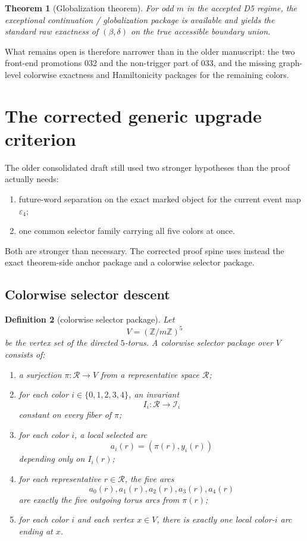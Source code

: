 \documentclass[11pt]{article}
\newtheorem{theorem}{Theorem}[section]
\newtheorem{definition}[theorem]{Definition}
\newcommand{\Z}{\mathbb Z}
\newcommand{\Rm}{\mathcal R}
\newcommand{\I}{\mathcal I}
\newcommand{\eps}{\varepsilon}
\begin{document}
\begin{theorem}[Globalization theorem]
For odd $m$ in the accepted D5 regime, the exceptional continuation /
globalization package is available and yields the standard raw exactness of
$(\beta,\delta)$ on the true accessible boundary union.
\end{theorem}

What remains open is therefore narrower than in the older manuscript: the two
front-end promotions \textup{032} and the non-trigger part of \textup{033},
and the missing graph-level colorwise exactness and Hamiltonicity packages for
the remaining colors.

\section{The corrected generic upgrade criterion}

The older consolidated draft still used two stronger hypotheses than the proof
actually needs:
\begin{enumerate}[label=\textup{(\roman*)},leftmargin=2.5em]
\item future-word separation on the exact marked object for the current event
      map $\eps_4$;
\item one common selector family carrying all five colors at once.
\end{enumerate}
Both are stronger than necessary. The corrected proof spine uses instead the
exact theorem-side anchor package and a colorwise selector package.

\subsection{Colorwise selector descent}

\begin{definition}[colorwise selector package]
Let
\[
V=(\Z/m\Z)^5
\]
be the vertex set of the directed $5$-torus.
A \emph{colorwise selector package} over $V$ consists of:
\begin{enumerate}[label=\textup{(C\arabic*)},leftmargin=2.9em]
\item a surjection $\pi:\Rm\to V$ from a representative space $\Rm$;
\item for each color $i\in\{0,1,2,3,4\}$, an invariant
      \[
      I_i:\Rm\to \I_i
      \]
      constant on every fiber of $\pi$;
\item for each color $i$, a local selected arc
      \[
      a_i(r)=(\pi(r),y_i(r))
      \]
      depending only on $I_i(r)$;
\item for each representative $r\in\Rm$, the five arcs
      \[
      a_0(r),a_1(r),a_2(r),a_3(r),a_4(r)
      \]
      are exactly the five outgoing torus arcs from $\pi(r)$;
\item for each color $i$ and each vertex $x\in V$, there is exactly one local
      color-$i$ arc ending at $x$.
\end{enumerate}
\end{definition}
\end{document}
